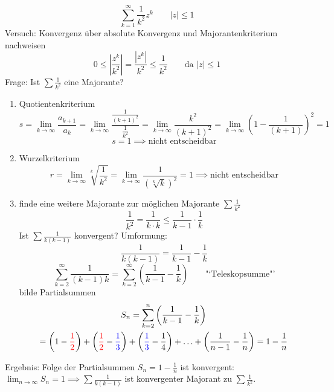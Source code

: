 \begin{example}
	\[
		\sum_{k=1}^\infty \frac{1}{k^2}z^k \qquad |z|\leq1
	\]
	Versuch: Konvergenz über absolute Konvergenz und Majorantenkriterium nachweisen
	\[
		0 \leq \left|\frac{z^k}{k^2}\right|=\frac{|z^k|}{k^2}\leq\frac{1}{k^2}\qquad \text{da } |z|\leq1
	\]
	Frage: Ist \( \sum\frac{1}{k^2} \) eine Majorante?
	
	\begin{enumerate}
		\item Quotientenkriterium 
		\[
		   s=\lim_{k\rightarrow\infty}\frac{a_{k+1}}{a_k}
			=\lim_{k\rightarrow\infty}\frac{\frac{1}{(k+1)^2}}{\frac{1}{k^2}}
			=\lim_{k\rightarrow\infty}\frac{k^2}{(k+1)^2}
			=\lim_{k\rightarrow\infty}\left(1-\frac{1}{(k+1)}\right)^2 
			= 1 
		\]
		\[
			s = 1 \implies \text{nicht entscheidbar} 
		\]
		\item Wurzelkriterium
		\[
		   r=\lim_{k\rightarrow\infty}\sqrt[k]{\frac{1}{k^2}}
			=\lim_{k\rightarrow\infty}\frac{1}{(\sqrt[k]{k})^2}
			= 1 \implies  \text{nicht entscheidbar}
		\]
		\item finde eine weitere Majorante zur möglichen Majorante \( \sum\frac{1}{k^2} \)
		\[
			\frac{1}{k^2}= \frac{1}{k\cdot k}\leq \frac{1}{k-1}\cdot\frac{1}{k}
		\]
		Ist \( \sum\frac{1}{k(k-1)} \) konvergent? Umformung:
		\[
			\frac{1}{k(k-1)}=\frac{1}{k-1}-\frac{1}{k}
		\]
		\[
			\sum_{k=2}^\infty\frac{1}{(k-1)k}=\sum_{k=2}^\infty\left(\frac{1}{k-1}-\frac{1}{k}\right) \qquad \text{"`Teleskopsumme"'}
		\]
		bilde Partialsummen
		\begin{multline*}
			S_n=\sum_{k=2}^n\left(\frac{1}{k-1}-\frac{1}{k}\right)\\=\left(1-{\color{red}\frac{1}{2}}\right)+\left({\color{red}\frac{1}{2}}-{\color{blue}\frac{1}{3}}\right)+\left({\color{blue}\frac{1}{3}}-\frac{1}{4}\right)+\ldots+\left(\frac{1}{n-1}-\frac{1}{n}\right)=1-\frac{1}{n}
		\end{multline*}
	\end{enumerate}
	Ergebnis: Folge der Partialsummen \( S_n = 1- \frac{1}{n}\) ist konvergent: \( \lim_{n\rightarrow\infty} S_n=1 \implies \sum\frac{1}{k(k-1)} \) ist konvergenter Majorant zu \( \sum\frac{1}{k^2} \).
\end{example}
